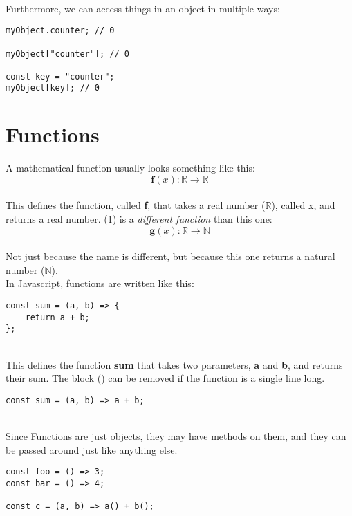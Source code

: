 \documentclass{article}
\begin{document}
\noindent
\\
Furthermore, we can access things in an object in multiple ways:

\begin{lstlisting}
myObject.counter; // 0

myObject["counter"]; // 0

const key = "counter";
myObject[key]; // 0
\end{lstlisting}

\section{Functions}

A mathematical function usually looks something like this:
\\
\begin{equation}
\textbf{f}(x):\mathbb{R}\rightarrow\mathbb{R}
\end{equation}
\\
This defines the function, called \textbf{f}, that takes a real number ($\mathbb{R}$), called x, and returns a real number. (1) is a \textit{different function} than this one:
\\
\begin{equation}
\textbf{g}(x):\mathbb{R}\rightarrow\mathbb{N}
\end{equation}
\\
Not just because the name is different, but because this one returns a natural number ($\mathbb{N}$).
\\
In Javascript, functions are written like this:
\\
\begin{lstlisting}
const sum = (a, b) => {
	return a + b;
};
\end{lstlisting}

\noindent
\\
This defines the function \textbf{sum} that takes two parameters, \textbf{a} and \textbf{b}, and returns their sum. The block ({}) can be removed if the function is a single line long.
\\
\begin{lstlisting}
const sum = (a, b) => a + b;
\end{lstlisting}
\noindent
\\
Since Functions are just objects, they may have methods on them, and they can be passed around just like anything else.
\\
\begin{lstlisting}
const foo = () => 3;
const bar = () => 4;

const c = (a, b) => a() + b();
\end{lstlisting}
\end{document}
